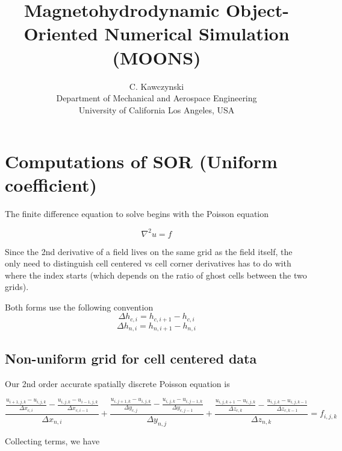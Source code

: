 \documentclass[11pt]{article}
\begin{document}
\doublespacing
\title{Magnetohydrodynamic Object-Oriented Numerical Simulation (MOONS)}
\author{C. Kawczynski \\
Department of Mechanical and Aerospace Engineering \\
University of California Los Angeles, USA\\
}
\maketitle

\section{Computations of SOR (Uniform coefficient)}
The finite difference equation to solve begins with the Poisson equation


\begin{equation}
	\nabla^2 u = f
\end{equation}

Since the 2nd derivative of a field lives on the same grid as the field itself, the only need to distinguish cell centered vs cell corner derivatives has to do with where the index starts (which depends on the ratio of ghost cells between the two grids).

Both forms use the following convention
\begin{equation}
	\Delta h_{c,i} = h_{c,i+1} - h_{c,i}
\end{equation}
\begin{equation}
	\Delta h_{n,i} = h_{n,i+1} - h_{n,i}
\end{equation}

\subsection{Non-uniform grid for cell centered data}
Our 2nd order accurate spatially discrete Poisson equation is

\begin{equation}
	\frac{\frac{u_{i+1,j,k}-u_{i,j,k}}{\Delta x_{c,i}} - \frac{u_{i,j,k}-u_{i-1,j,k}}{\Delta x_{c,i-1}}}{\Delta x_{n,i}} + 
	\frac{\frac{u_{i,j+1,k}-u_{i,j,k}}{\Delta y_{c,j}} - \frac{u_{i,j,k}-u_{i,j-1,k}}{\Delta y_{c,j-1}}}{\Delta y_{n,j}} +
	\frac{\frac{u_{i,j,k+1}-u_{i,j,k}}{\Delta z_{c,k}} - \frac{u_{i,j,k}-u_{i,j,k-1}}{\Delta z_{c,k-1}}}{\Delta z_{n,k}} = f_{i,j,k}
\end{equation}

Collecting terms, we have
\end{document}
